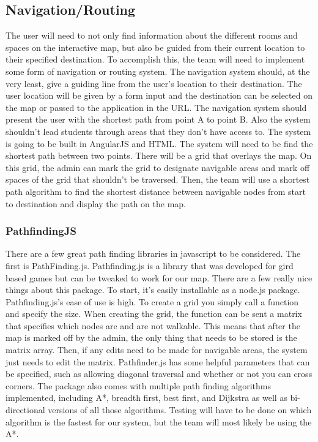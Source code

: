 \documentclass[letterpaper,10pt,titlepage, onecolumn, compsoc]{IEEEtran}
\begin{document}
\subsection{Navigation/Routing}
The user will need to not only find information about the different rooms and spaces on the interactive map, but also be guided from their current location to their specified destination. To accomplish this, the team will need to implement some form of navigation or routing system. The navigation system should, at the very least, give a guiding line from the user’s location to their destination. The user location will be given by a form input and the destination can be selected on the map or passed to the application in the URL.  The navigation system should present the user with the shortest path from point A to point B. Also the system shouldn’t lead students through areas that they don’t have access to. 
\linebreak
The system is going to be built in AngularJS and HTML. The system will need to be find the shortest path between two points. There will be a grid that overlays the map. On this grid, the admin can mark the grid to designate navigable areas and mark off spaces of the grid that shouldn’t be traversed. Then, the team will use a shortest path algorithm to find the shortest distance between navigable nodes from start to destination and display the path on the map. 

\subsubsection{PathfindingJS}
There are a few great path finding libraries in javascript to be considered. The first is PathFinding.js. Pathfinding.js is a library that was developed for gird based games but can be tweaked to work for our map. There are a few really nice things about this package. To start, it’s easily installable as a node.js package. Pathfinding.js’s ease of use is high. To create a grid you simply call a function and specify the size. When creating the grid, the function can be sent a matrix that specifies which nodes are and are not walkable. This means that after the map is marked off by the admin, the only thing that needs to be stored is the matrix array. Then, if any edits need to be made for navigable areas, the system just needs to edit the matrix. 
Pathfinder.js has some helpful parameters that can be specified, such as allowing diagonal traversal and whether or not you can cross corners. The package also comes with multiple path finding algorithms implemented, including A*, breadth first, best first, and Dijkstra as well as bi-directional versions of all those algorithms. Testing will have to be done on which algorithm is the fastest for our system, but the team will most likely be using the A*. 
\cite{pathfinding}
\end{document}
